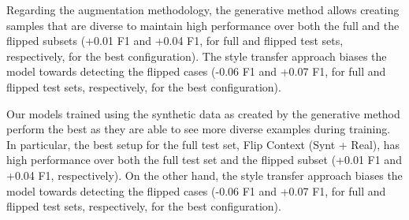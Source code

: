 \documentclass[acmsmall]{acmart}
\begin{document}
Regarding the augmentation methodology, the generative method allows creating samples that are diverse to maintain high performance over both the full and the flipped subsets (+0.01 F1 and +0.04 F1, for full and flipped test sets, respectively, for the best configuration). The style transfer approach biases the model towards detecting the flipped cases (-0.06 F1 and +0.07 F1, for full and flipped test sets, respectively, for the best configuration).

Our models trained using the synthetic data as created by the generative method perform the best as they are able to see more diverse examples during training. In particular, the best setup for the full test set, Flip Context (Synt + Real), has high performance over both the full test set and the flipped subset (+0.01 F1 and +0.04 F1, respectively). On the other hand, the style transfer approach biases the model towards detecting the flipped cases (-0.06 F1 and +0.07 F1, for full and flipped test sets, respectively, for the best configuration).
\end{document}
